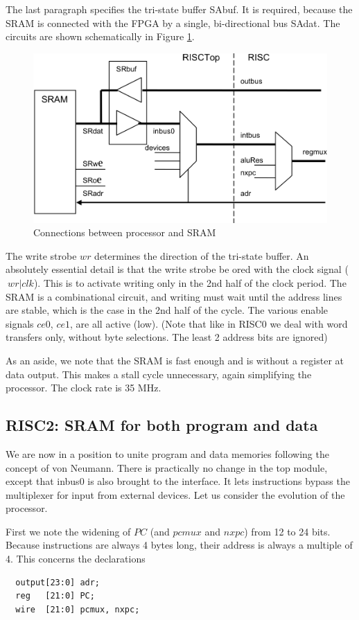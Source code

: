 The last paragraph specifies the tri-state buffer SAbuf. It is required, because the SRAM is
connected with the FPGA by a single, bi-directional bus SAdat. The circuits are shown
schematically in Figure \ref{fig:conn}.
\begin{figure}[h!]
  \centering
  \includegraphics[width=.9\textwidth]{i/d.png}
  \caption{Connections between processor and SRAM}
  \label{fig:conn}
\end{figure}

The write strobe $wr$ determines the direction of the tri-state buffer. An absolutely essential
detail is that the write strobe be ored with the clock signal ($~wr | clk$). This is to activate
writing only in the 2nd half of the clock period. The SRAM is a combinational circuit, and writing
must wait until the address lines are stable, which is the case in the 2nd half of the cycle. The
various enable signals $ce0$, $ce1$, are all active (low). (Note that like in RISC0 we deal with
word transfers only, without byte selections. The least 2 address bits are ignored)

As an aside, we note that the SRAM is fast enough and is without a register at data output. This
makes a stall cycle unnecessary, again simplifying the processor. The clock rate is 35 MHz.

\subsection{RISC2: SRAM for both program and data}
We are now in a position to unite program and data memories following the concept of von Neumann.
There is practically no change in the top module, except that inbus0 is also brought to the
interface. It lets instructions bypass the multiplexer for input from external devices. Let us
consider the evolution of the processor.

First we note the widening of $PC$ (and $pcmux$ and $nxpc$) from 12 to 24 bits. Because instructions
are always 4 bytes long, their address is always a multiple of 4. This concerns the declarations
\begin{verbatim}
  output[23:0] adr;
  reg   [21:0] PC;
  wire  [21:0] pcmux, nxpc;
\end{verbatim}

